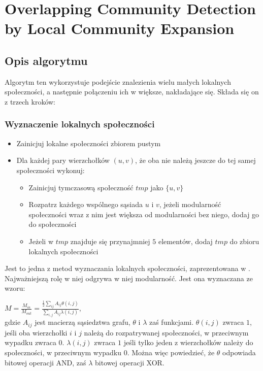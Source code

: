 \documentclass{article}
\begin{document}
\newpage
\section{Overlapping Community Detection by Local Community Expansion}
\subsection{Opis algorytmu}
Algorytm ten wykorzystuje podejście znalezienia wielu małych lokalnych społeczności, a następnie połączeniu ich w większe, nakładające się. Składa się on z trzech kroków:

\subsubsection{Wyznaczenie lokalnych społeczności}
\begin{itemize}
\item Zainicjuj lokalne społeczności zbiorem pustym
\item Dla każdej pary wierzchołków $(u,v)$, że oba nie należą jeszcze do tej samej społeczności wykonuj:
\begin{itemize}
\item Zainicjuj tymczasową społeczność $tmp$ jako $\{u,v\}$
\item Rozpatrz każdego wspólnego sąsiada $u$ i $v$, jeżeli modularność społeczności wraz z nim jest większa od modularności bez niego, dodaj go do społeczności
\item Jeżeli w $tmp$ znajduje się przynajmniej $5$ elementów, dodaj $tmp$ do zbioru lokalnych społeczności
\end{itemize}
\end{itemize}

Jest to jedna z metod wyznaczania lokalnych społeczności, zaprezentowana w \cite{bt-paper1}. Najważniejszą rolę w niej odgrywa w niej modularność. Jest ona wyznaczana ze wzoru:

$M = \frac{M_{in}}{M_{out}} = \frac{\frac{1}{2}\sum_{ij}A_{ij}\theta(i,j)}{\sum_{i,j}A_{ij}\lambda(i,j)}$,\\
gdzie $A_{ij}$ jest macierzą sąsiedztwa grafu, $\theta$ i $\lambda$ zaś funkcjami. $\theta(i,j)$ zwraca $1$, jeśli oba wierzchołki $i$ i $j$ należą do rozpatrywanej społeczności, w przeciwnym wypadku zwraca $0$. $\lambda(i,j)$ zwraca $1$ jeśli tylko jeden z wierzchołków należy do społeczności, w przeciwnym wypadku $0$. Można więc powiedzieć, że $\theta$ odpowiada bitowej operacji AND, zaś $\lambda$ bitowej operacji XOR.
\end{document}
